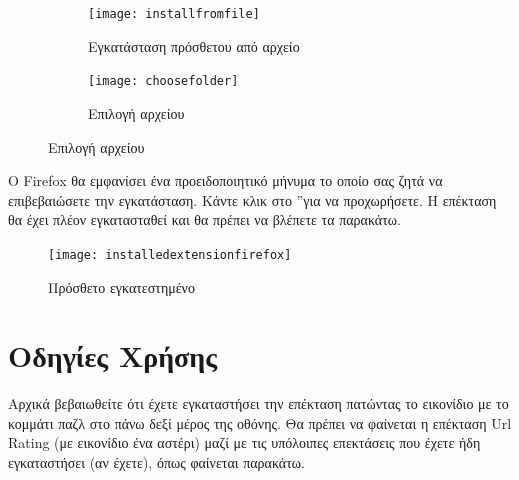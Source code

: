 \documentclass{article}
\begin{document}
\begin{figure}[H]
    \centering
    \begin{minipage}[t]{0.45\textwidth}
        \centering
        \begin{subfigure}[t]{\textwidth}
            \texttt{[image: installfromfile]}
        \caption{Eγκατάσταση πρόσθετου από αρχείο}
        \label{Fig:installfromfile}
        \end{subfigure}
        \vspace{\fill}
    \end{minipage}
    \hfill
    \begin{minipage}{0.45\textwidth}
        \begin{subfigure}{\textwidth}
            \texttt{[image: choosefolder]}
            \caption{Επιλογή αρχείου}
            \label{Fig:choosefile}
        \end{subfigure}
    \end{minipage}
\end{figure}

Ο Firefox θα εμφανίσει ένα προειδοποιητικό μήνυμα το οποίο σας ζητά να επιβεβαιώσετε την εγκατάσταση. Κάντε κλικ στο \textquotedblright για να προχωρήσετε. Η επέκταση θα έχει πλέον εγκατασταθεί και θα πρέπει να βλέπετε τα παρακάτω.

\begin{figure}[H]
    \texttt{[image: installedextensionfirefox]}
    \caption*{Πρόσθετο εγκατεστημένο}
\end{figure}

\section*{Οδηγίες Χρήσης}

Αρχικά βεβαιωθείτε ότι έχετε εγκαταστήσει την επέκταση πατώντας το εικονίδιο με το κομμάτι παζλ στο πάνω δεξί μέρος της οθόνης. Θα πρέπει να φαίνεται η επέκταση Url Rating (με εικονίδιο ένα αστέρι) μαζί με τις υπόλοιπες επεκτάσεις που έχετε ήδη εγκαταστήσει (αν έχετε), όπως φαίνεται παρακάτω.
\end{document}
